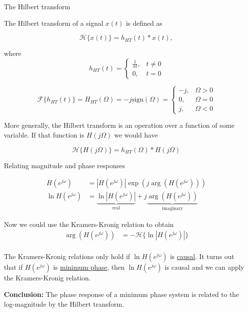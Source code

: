 \documentclass[10pt, handout]{beamer}
\begin{document}
\begin{frame}{The Hilbert transform}

The Hilbert transform of a signal $x(t)$ is defined as

\begin{equation*}
\mathcal{H}\{x(t)\} = h_{HT}(t)\ast x(t),
\end{equation*}

where 
\begin{equation*}
h_{HT}(t) = \begin{cases}
\frac{1}{\pi t}, & t \neq 0 \\
0, & t = 0
\end{cases}
\end{equation*}

\begin{equation*}
\mathcal{F}\{h_{HT}(t)\}  = H_{HT}(\Omega) = -j\mathrm{sign}(\Omega) = \begin{cases}
-j, & \Omega > 0 \\
0, & \Omega = 0 \\
j, & \Omega < 0
\end{cases}
\end{equation*}

More generally, the Hilbert transform is an operation over a function of some variable. If that function is $H(j\Omega)$ we would have

\begin{equation*}
\mathcal{H}\{H(j\Omega)\} = h_{HT}(\Omega)\ast H(j\Omega)
\end{equation*}

\end{frame}

\begin{frame}{Relating magnitude and phase responses}

\begin{align*}
H(e^{j\omega}) &= |H(e^{j\omega})|\exp(j\arg(H(e^{j\omega}))) \\
\ln H(e^{j\omega}) &= \underbrace{\ln |H(e^{j\omega})|}_{\text{real}} + j\underbrace{\arg(H(e^{j\omega}))}_{\text{imaginary}} \tag{taking $\ln$ of both sides}
\end{align*}

Now we could use the Kramers-Kronig relation to obtain
\begin{align*}
\arg(H(e^{j\omega})) &= -\mathcal{H}\{\ln |H(e^{j\omega})|\} \\
\end{align*}

The Kramers-Kronig relations only hold if $\ln H(e^{j\omega})$ is \underline{causal}. It turns out that if $H(e^{j\omega})$ is \underline{minimum phase}, then  $\ln H(e^{j\omega})$ is causal and we can apply the Kramers-Kronig relation.

\textbf{Conclusion:} The phase response of a minimum phase system is related to the  log-magnitude by the Hilbert transform.


\end{frame}
\end{document}
